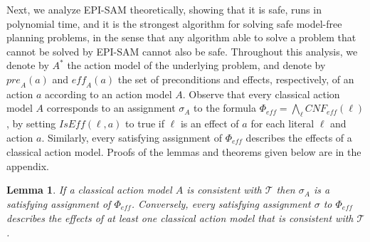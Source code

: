 \documentclass[letterpaper]{article} %
\newcommand{\tuple}[1]{\ensuremath{\left \langle #1 \right \rangle }}
\newcommand{\pre}{\textit{pre}}
\newcommand{\eff}{\textit{eff}}
\newcommand{\cnf}{\textit{CNF}}
\newcommand{\true}{\textit{true}}
\newcommand{\iseff}{\textit{IsEff}}
\newcommand{\ispre}{\textit{IsPre}}
\newcommand{\state}{\textit{State}}
\newtheorem{lemma}{Lemma}
\begin{document}
Next, we analyze EPI-SAM theoretically, showing that it is safe, runs in polynomial time, and it is the strongest algorithm for solving safe model-free planning problems, in the sense that any algorithm able to solve a problem that cannot be solved by EPI-SAM cannot also be safe.
Throughout this analysis, we denote by $A^*$ the action model of the underlying problem, and denote by $\pre_A(a)$ and $\eff_A(a)$ the set of preconditions and effects, respectively, of an action $a$ according to an action model $A$.
Observe that every classical action model $A$ corresponds to an assignment $\sigma_A$ to the formula $\Phi_\eff=\bigwedge_\ell \cnf_\eff(\ell)$, by setting $\iseff(\ell,a)$ to true if $\ell$ is an effect of $a$ for each literal $\ell$ and action $a$.
Similarly, every satisfying assignment of $\Phi_\eff$ describes the effects of a classical action model.
Proofs of the lemmas and theorems given below are in the appendix.
\begin{lemma}\label{lem:cnf-char}
If a classical action model $A$ is consistent with $\mathcal{T}$
then $\sigma_A$ is a satisfying assignment of $\Phi_\eff$.
Conversely, every satisfying assignment $\sigma$ to $\Phi_\eff$ describes the effects of at least one classical action model that is consistent with $\mathcal{T}$.
\end{lemma}
\end{document}
